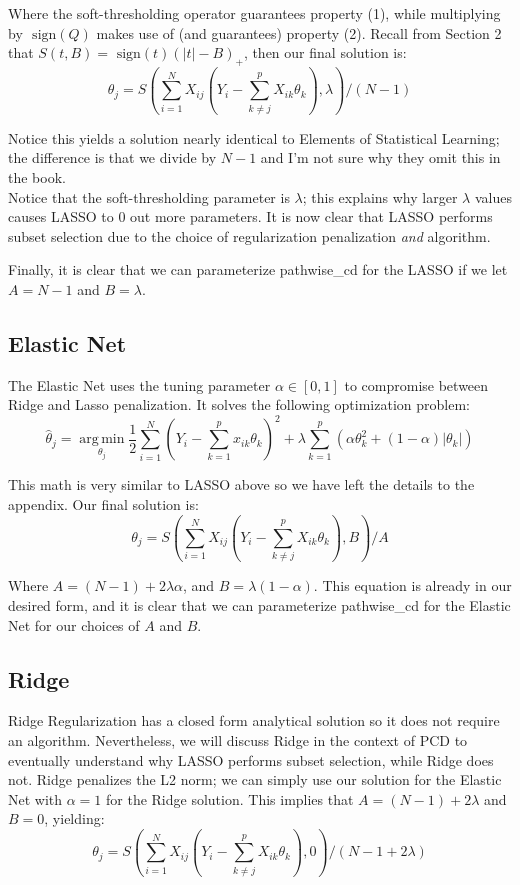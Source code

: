 \documentclass[11pt]{article}
\newcommand{\thh}{\hat{\theta}}
\newcommand{\sgn}{\text{ sign}}
\DeclareMathOperator*{\argmin}{arg\,min}
\begin{document}
Where the soft-thresholding operator guarantees property (1), while multiplying by $\sgn(Q)$ makes use of (and guarantees) property (2).  Recall from Section 2 that $S(t,B) = \sgn(t)(|t|-B)_+$, then our final solution is:
	$$\theta_j = S\left(\sum\limits_{i=1}^N X_{ij}(Y_i - \sum\limits_{k \ne j}^p X_{ik}\theta_k), \lambda\right)/(N-1)$$

Notice this yields a solution nearly identical to Elements of Statistical Learning\cite{ht}; the difference is that we divide by $N-1$ and I'm not sure why they omit this in the book.  \\

Notice that the soft-thresholding parameter is $\lambda$; this explains why larger $\lambda$ values causes LASSO to 0 out more parameters.  It is now clear that LASSO performs subset selection due to the choice of regularization penalization \textit{and} algorithm.  

Finally, it is clear that we can parameterize pathwise\_cd for the LASSO if we let $A=N-1$ and $B=\lambda$.  


\subsection{Elastic Net}
The Elastic Net uses the tuning parameter $\alpha \in [0,1]$ to compromise between Ridge and Lasso penalization.  It solves the following optimization problem:
	$$\thh_j = \argmin\limits_{\theta_j} \frac{1}{2} \sum\limits_{i=1}^N \left(Y_i - \sum\limits_{k=1}^px_{ik}\theta_k \right)^2 + \lambda \sum\limits_{k=1}^p \left(\alpha\theta_k^2 + (1-\alpha)|\theta_k| \right)$$

This math is very similar to LASSO above so we have left the details to the appendix.  Our final solution is:
	$$\theta_j = S\left(\sum\limits_{i=1}^N X_{ij}(Y_i - \sum\limits_{k \ne j}^p X_{ik}\theta_k), B\right)/A$$

Where $A=(N-1)+2\lambda\alpha$, and $B=\lambda(1-\alpha)$.  This equation is already in our desired form, and it is clear that we can parameterize pathwise\_cd for the Elastic Net for our choices of $A$ and $B$.  

\subsection{Ridge}
Ridge Regularization has a closed form analytical solution so it does not require an algorithm.  Nevertheless, we will discuss Ridge in the context of PCD to eventually understand why LASSO performs subset selection, while Ridge does not.  Ridge penalizes the L2 norm; we can simply use our solution for the Elastic Net with $\alpha=1$ for the Ridge solution.  This implies that $A=(N-1)+2\lambda$ and $B=0$, yielding:
	$$\theta_j = S\left(\sum\limits_{i=1}^N X_{ij}(Y_i - \sum\limits_{k \ne j}^p X_{ik}\theta_k), 0\right)/(N-1+2\lambda)$$
\end{document}

